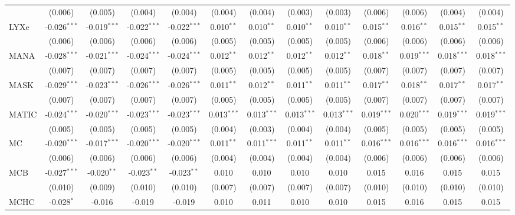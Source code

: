 \begin{table}[!htbp]
\begin{tabular}{@{\extracolsep{5pt}}lcccccccccccc}
  & (0.006) & (0.005) & (0.004) & (0.004) & (0.004) & (0.004) & (0.003) & (0.003) & (0.006) & (0.006) & (0.004) & (0.004) \\
 LYXe & -0.026$^{***}$ & -0.019$^{***}$ & -0.022$^{***}$ & -0.022$^{***}$ & 0.010$^{**}$ & 0.010$^{**}$ & 0.010$^{**}$ & 0.010$^{**}$ & 0.015$^{**}$ & 0.016$^{**}$ & 0.015$^{**}$ & 0.015$^{**}$ \\
  & (0.006) & (0.006) & (0.006) & (0.006) & (0.005) & (0.005) & (0.005) & (0.005) & (0.006) & (0.006) & (0.006) & (0.006) \\
 MANA & -0.028$^{***}$ & -0.021$^{***}$ & -0.024$^{***}$ & -0.024$^{***}$ & 0.012$^{**}$ & 0.012$^{**}$ & 0.012$^{**}$ & 0.012$^{**}$ & 0.018$^{**}$ & 0.019$^{***}$ & 0.018$^{***}$ & 0.018$^{***}$ \\
  & (0.007) & (0.007) & (0.007) & (0.007) & (0.005) & (0.005) & (0.005) & (0.005) & (0.007) & (0.007) & (0.007) & (0.007) \\
 MASK & -0.029$^{***}$ & -0.023$^{***}$ & -0.026$^{***}$ & -0.026$^{***}$ & 0.011$^{**}$ & 0.012$^{**}$ & 0.011$^{**}$ & 0.011$^{**}$ & 0.017$^{**}$ & 0.018$^{**}$ & 0.017$^{**}$ & 0.017$^{**}$ \\
  & (0.007) & (0.007) & (0.007) & (0.007) & (0.005) & (0.005) & (0.005) & (0.005) & (0.007) & (0.007) & (0.007) & (0.007) \\
 MATIC & -0.024$^{***}$ & -0.020$^{***}$ & -0.023$^{***}$ & -0.023$^{***}$ & 0.013$^{***}$ & 0.013$^{***}$ & 0.013$^{***}$ & 0.013$^{***}$ & 0.019$^{***}$ & 0.020$^{***}$ & 0.019$^{***}$ & 0.019$^{***}$ \\
  & (0.005) & (0.005) & (0.005) & (0.005) & (0.004) & (0.003) & (0.004) & (0.004) & (0.005) & (0.005) & (0.005) & (0.005) \\
 MC & -0.020$^{***}$ & -0.017$^{***}$ & -0.020$^{***}$ & -0.020$^{***}$ & 0.011$^{**}$ & 0.011$^{***}$ & 0.011$^{**}$ & 0.011$^{**}$ & 0.016$^{***}$ & 0.016$^{***}$ & 0.016$^{***}$ & 0.016$^{***}$ \\
  & (0.006) & (0.006) & (0.006) & (0.006) & (0.004) & (0.004) & (0.004) & (0.004) & (0.006) & (0.006) & (0.006) & (0.006) \\
 MCB & -0.027$^{***}$ & -0.020$^{**}$ & -0.023$^{**}$ & -0.023$^{**}$ & 0.010$^{}$ & 0.010$^{}$ & 0.010$^{}$ & 0.010$^{}$ & 0.015$^{}$ & 0.016$^{}$ & 0.015$^{}$ & 0.015$^{}$ \\
  & (0.010) & (0.009) & (0.010) & (0.010) & (0.007) & (0.007) & (0.007) & (0.007) & (0.010) & (0.010) & (0.010) & (0.010) \\
 MCHC & -0.028$^{*}$ & -0.016$^{}$ & -0.019$^{}$ & -0.019$^{}$ & 0.010$^{}$ & 0.011$^{}$ & 0.010$^{}$ & 0.010$^{}$ & 0.015$^{}$ & 0.016$^{}$ & 0.015$^{}$ & 0.015$^{}$ \\

\end{tabular}
\end{table}
